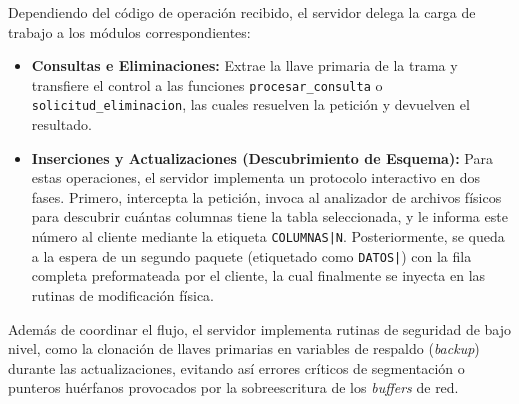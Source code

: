 \documentclass[12pt]{article}
\begin{document}
Dependiendo del código de operación recibido, el servidor delega la carga de trabajo a los módulos correspondientes:
\begin{itemize}
    \item \textbf{Consultas e Eliminaciones:} Extrae la llave primaria de la trama y transfiere el control a las funciones \texttt{procesar\_consulta} o \texttt{solicitud\_eliminacion}, las cuales resuelven la petición y devuelven el resultado.
    \item \textbf{Inserciones y Actualizaciones (Descubrimiento de Esquema):} Para estas operaciones, el servidor implementa un protocolo interactivo en dos fases. Primero, intercepta la petición, invoca al analizador de archivos físicos para descubrir cuántas columnas tiene la tabla seleccionada, y le informa este número al cliente mediante la etiqueta \texttt{COLUMNAS|N}. Posteriormente, se queda a la espera de un segundo paquete (etiquetado como \texttt{DATOS|}) con la fila completa preformateada por el cliente, la cual finalmente se inyecta en las rutinas de modificación física.
\end{itemize}

Además de coordinar el flujo, el servidor implementa rutinas de seguridad de bajo nivel, como la clonación de llaves primarias en variables de respaldo (\textit{backup}) durante las actualizaciones, evitando así errores críticos de segmentación o punteros huérfanos provocados por la sobreescritura de los \textit{buffers} de red.
\end{document}
